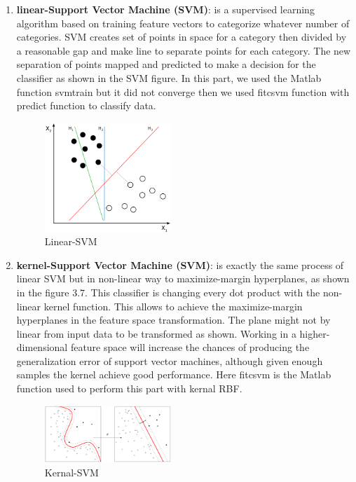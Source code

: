 \begin{enumerate}
\item \textbf{linear-Support Vector Machine (SVM)}: is a supervised learning algorithm based on training feature vectors to categorize whatever number of categories.
SVM creates set of points in space for a category then divided by a reasonable gap and make line to separate points for each category\cite{vermeer2011automated}.
The new separation of points mapped and predicted to make a decision for the classifier as shown in the SVM figure.
In this part, we used the Matlab function svmtrain but it did not converge then we used fitcsvm function with predict function to classify data.

\begin{figure}[htb]
        \centering
        \includegraphics[width = 0.45\textwidth]{figures/SVM.png} %
  \caption{Linear-SVM \cite{SVMmethod}}
  \label{fig:SVM}
\end{figure}

\item \textbf{kernel-Support Vector Machine (SVM)}: is exactly the same process of linear SVM but in non-linear way to maximize-margin hyperplanes, as shown in the figure 3.7.
This classifier is changing every dot product with the non-linear kernel function.
This allows to achieve the maximize-margin hyperplanes in the feature space transformation.
The plane might not by linear from input data to be transformed as shown.
Working in a higher-dimensional feature space will increase the chances of producing the generalization error of support vector machines, although given enough samples the kernel achieve good performance.
Here fitcsvm is the Matlab function used to perform this part with kernal RBF.
\begin{figure}[htb]
        \centering
        \includegraphics[width = 0.45\textwidth]{figures/Kernel_Machine.png} %
  \caption{Kernal-SVM \cite{SVMmethodkernal}}
  \label{fig:SVM}
\end{figure}


\end{enumerate}
